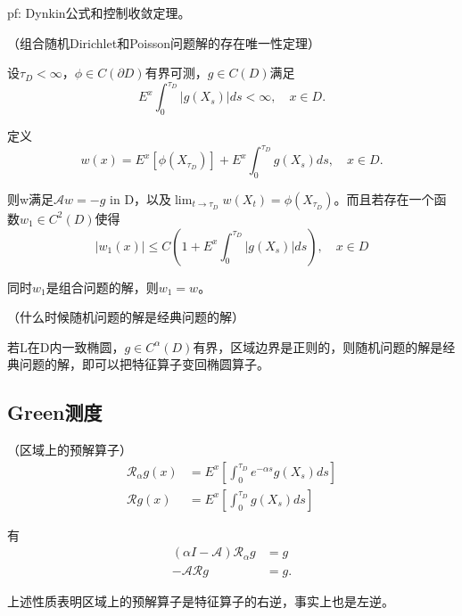 pf: Dynkin公式和控制收敛定理。

\begin{thm}（组合随机Dirichlet和Poisson问题解的存在唯一性定理）
  
  设$\tau_{D}<\infty$，$\phi \in C(\partial D)$有界可测，$g \in C(D)$满足
  \[
    E^{x} \int_{0}^{\tau_{D}}|g\left(X_{s}\right)| d s<\infty, \quad x \in D.
  \]

  定义
  \[
    w(x)=E^{x}\left[\phi\left(X_{\tau_{D}}\right)\right]+E^{x} \int_{0}^{\tau_{D}} g\left(X_{s}\right) d s, \quad x \in D .
  \]
  
  则w满足$\mathcal{A} w=-g$ in D，以及$\lim _{t \rightarrow \tau_{D}} w\left(X_{t}\right)=\phi\left(X_{\tau_{D}}\right)$。而且若存在一个函数$w_{1} \in C^{2}(D)$使得
  \[
    |w_{1}(x)| \leq C\left(1+E^{x} \int_{0}^{\tau_{D}}|g\left(X_{s}\right)| d s\right), \quad x \in D
  \]
  
  同时$w_{1}$是组合问题的解，则$w_{1}=w$。
\end{thm}

\begin{thm}（什么时候随机问题的解是经典问题的解）
  
  若L在D内一致椭圆，$g \in C^{\alpha}(D)$有界，区域边界是正则的，则随机问题的解是经典问题的解，即可以把特征算子变回椭圆算子。
\end{thm}

\subsection{Green测度}

\begin{df}（区域上的预解算子）
  \[
    \begin{aligned}
      \mathcal{R}_\alpha g(x) &= E^x\left[\int_0^{\tau_D} e^{-\alpha s}g(X_s) ds\right]\\
      \mathcal{R} g(x) &= E^x\left[\int_0^{\tau_D} g(X_s) ds\right]
    \end{aligned}
  \]

  有
  \[
    \begin{aligned}
      (\alpha I - \mathcal{A}) \mathcal{R}_\alpha g &= g\\
      - \mathcal{A} \mathcal{R} g &= g.
    \end{aligned}
  \]
\end{df}

上述性质表明区域上的预解算子是特征算子的右逆，事实上也是左逆。

